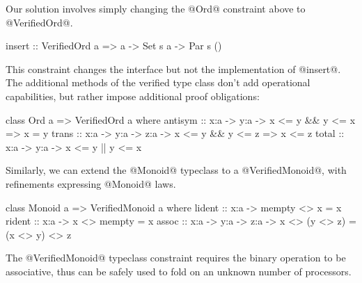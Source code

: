 %
Our solution involves simply changing the @Ord@ constraint above to
@VerifiedOrd@.
\begin{mcode}
  insert :: VerifiedOrd a => a -> Set s a -> Par s ()
\end{mcode}
%
This constraint changes the interface but not the implementation of @insert@.
%
%
The additional methods of the verified type class don't add operational
capabilities, but rather impose additional proof obligations:

\begin{code}
  class Ord a => VerifiedOrd a where
   antisym :: x:a -> y:a -> { x <= y && y <= x => x = y }
   trans   :: x:a -> y:a -> z:a -> { x <= y && y <= z => x <= z }
   total   :: x:a -> y:a -> { x <= y || y <= x }
\end{code}


Similarly, we can extend
the @Monoid@ typeclass to a @VerifiedMonoid@, with refinements
expressing @Monoid@ laws.
%
\begin{code}
  class Monoid a => VerifiedMonoid a where
   lident :: x:a -> { mempty <> x = x }
   rident :: x:a -> { x <> mempty = x }
   assoc  :: x:a -> y:a -> z:a -> { x <> (y <> z) = (x <> y) <> z }
\end{code}
The @VerifiedMonoid@ typeclass constraint requires the binary operation
to be associative, thus can be safely used to fold on
an unknown number of processors.




